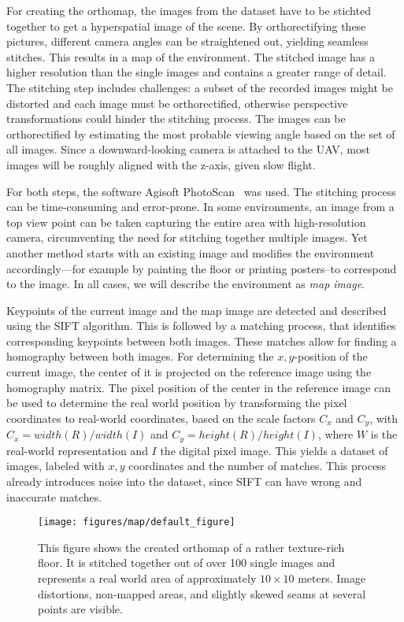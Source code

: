 For creating the orthomap, the images from the dataset have to be stichted
together to get a hyperspatial image of the scene. By orthorectifying
these pictures, different camera angles can be straightened out,
yielding seamless stitches. This results in a map of the
environment. The stitched image has a higher resolution than the
single images and contains a greater range of detail. The stitching
step includes challenges: a subset of the recorded images might be
distorted and each image must be orthorectified, otherwise perspective
transformations could hinder the stitching process. The images can be
orthorectified by estimating the most probable viewing angle based on
the set of all images. Since a downward-looking camera is attached to
the UAV, most images will be roughly aligned with the z-axis, given
slow flight.

For both steps, the software Agisoft
PhotoScan~\cite{agisoft2013agisoft} was used. The stitching process
can be time-consuming and error-prone. In some environments, an image
from a top view point can be taken capturing the entire area with
high-resolution camera, circumventing the need for stitching together
multiple images. Yet another method starts with an existing image and
modifies the environment accordingly---for example by painting the
floor or printing posters--to correspond to the image. In all cases,
we will describe the environment as \emph{map image}. 

Keypoints of the current image and the map image are detected and
described using the SIFT algorithm. This is followed by a matching
process, that identifies corresponding keypoints between both
images. These matches allow for finding a homography between both
images. For determining the $x, y$-position of the current image, the
center of it is projected on the reference image using the homography
matrix. The pixel position of the center in the reference image can be
used to determine the real world position by transforming the pixel
coordinates to real-world coordinates, based on the scale factors
$C_x$ and $C_y$, with $C_x = width(R) / width(I)$ and
$C_y = height(R) / height(I)$, where $W$ is the real-world
representation and $I$ the digital pixel image. This yields a dataset
of images, labeled with $x, y$ coordinates and the number of
matches. This process already introduces noise into the dataset, since
SIFT can have wrong and inaccurate matches.

\begin{figure}[h!]
\begin{center}
\texttt{[image: figures/map/default\_figure]}
\caption{{\label{fig:orthomap} This figure shows
    the created orthomap of a rather texture-rich floor. It is
    stitched together out of over 100 single images and represents a
    real world area of approximately $10\times10$ meters. Image
    distortions, non-mapped areas, and slightly skewed seams at
    several points are visible.%
}}
\end{center}
\end{figure}

